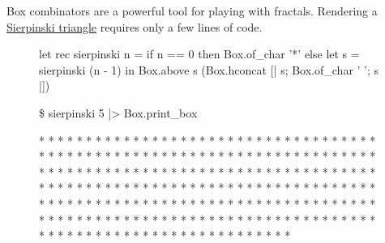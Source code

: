 \documentclass{article}
\begin{document}
Box combinators are a powerful tool for playing with fractals.
Rendering a \href{https://en.wikipedia.org/wiki/Sierpi%C5%84ski_triangle}{Sierpinski triangle} requires only a few lines of code.

\begin{figure}
\begin{code}[ocaml]
let rec sierpinski n =
    if n == 0 then Box.of_char '*'
    else let s = sierpinski (n - 1) in
         Box.above s (Box.hconcat [| s; Box.of_char ' '; s |])
\end{code}
\end{figure}

\begin{figure}
\begin{code}[text]
\$ sierpinski 5 |> Box.print_box

                               *
                              * *
                             *   *
                            * * * *
                           *       *
                          * *     * *
                         *   *   *   *
                        * * * * * * * *
                       *               *
                      * *             * *
                     *   *           *   *
                    * * * *         * * * *
                   *       *       *       *
                  * *     * *     * *     * *
                 *   *   *   *   *   *   *   *
                * * * * * * * * * * * * * * * *
               *                               *
              * *                             * *
             *   *                           *   *
            * * * *                         * * * *
           *       *                       *       *
          * *     * *                     * *     * *
         *   *   *   *                   *   *   *   *
        * * * * * * * *                 * * * * * * * *
       *               *               *               *
      * *             * *             * *             * *
     *   *           *   *           *   *           *   *
    * * * *         * * * *         * * * *         * * * *
   *       *       *       *       *       *       *       *
  * *     * *     * *     * *     * *     * *     * *     * *
 *   *   *   *   *   *   *   *   *   *   *   *   *   *   *   *
* * * * * * * * * * * * * * * * * * * * * * * * * * * * * * * *
\end{code}
\end{figure}
\end{document}

